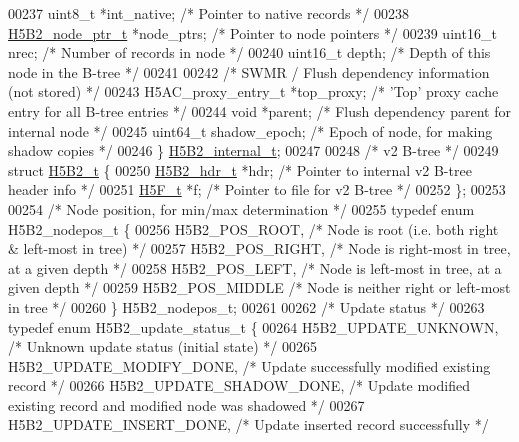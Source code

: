 \begin{DoxyCode}
{{00237     uint8\_t     *int\_native;    \textcolor{comment}{/* Pointer to native records                  */}
00238     \hyperlink{struct_h5_b2__node__ptr__t}{H5B2\_node\_ptr\_t} *node\_ptrs; \textcolor{comment}{/* Pointer to node pointers                   */}
00239     uint16\_t    nrec;           \textcolor{comment}{/* Number of records in node                  */}
00240     uint16\_t    depth;          \textcolor{comment}{/* Depth of this node in the B-tree           */}
00241 
00242     \textcolor{comment}{/* SWMR / Flush dependency information (not stored) */}
00243     H5AC\_proxy\_entry\_t *top\_proxy;  \textcolor{comment}{/* 'Top' proxy cache entry for all B-tree entries */}
00244     \textcolor{keywordtype}{void}        *parent;        \textcolor{comment}{/* Flush dependency parent for internal node  */}
00245     uint64\_t    shadow\_epoch;   \textcolor{comment}{/* Epoch of node, for making shadow copies */}
00246 \} \hyperlink{struct_h5_b2__internal__t}{H5B2\_internal\_t};
00247 
00248 \textcolor{comment}{/* v2 B-tree */}
00249 \textcolor{keyword}{struct }\hyperlink{struct_h5_b2__t}{H5B2\_t} \{
00250     \hyperlink{struct_h5_b2__hdr__t}{H5B2\_hdr\_t}  *hdr;           \textcolor{comment}{/* Pointer to internal v2 B-tree header info */}
00251     \hyperlink{struct_h5_f__t}{H5F\_t}      *f;              \textcolor{comment}{/* Pointer to file for v2 B-tree */}
00252 \};
00253 
00254 \textcolor{comment}{/* Node position, for min/max determination */}
00255 \textcolor{keyword}{typedef} \textcolor{keyword}{enum} H5B2\_nodepos\_t \{
00256     H5B2\_POS\_ROOT,              \textcolor{comment}{/* Node is root (i.e. both right & left-most in tree) */}
00257     H5B2\_POS\_RIGHT,             \textcolor{comment}{/* Node is right-most in tree, at a given depth */}
00258     H5B2\_POS\_LEFT,              \textcolor{comment}{/* Node is left-most in tree, at a given depth */}
00259     H5B2\_POS\_MIDDLE             \textcolor{comment}{/* Node is neither right or left-most in tree */}
00260 \} H5B2\_nodepos\_t;
00261 
00262 \textcolor{comment}{/* Update status */}
00263 \textcolor{keyword}{typedef} \textcolor{keyword}{enum} H5B2\_update\_status\_t \{
00264     H5B2\_UPDATE\_UNKNOWN,            \textcolor{comment}{/* Unknown update status (initial state) */}
00265     H5B2\_UPDATE\_MODIFY\_DONE,        \textcolor{comment}{/* Update successfully modified existing record */}
00266     H5B2\_UPDATE\_SHADOW\_DONE,        \textcolor{comment}{/* Update modified existing record and modified node was shadowed */}
00267     H5B2\_UPDATE\_INSERT\_DONE,        \textcolor{comment}{/* Update inserted record successfully */}
}}
\end{DoxyCode}
